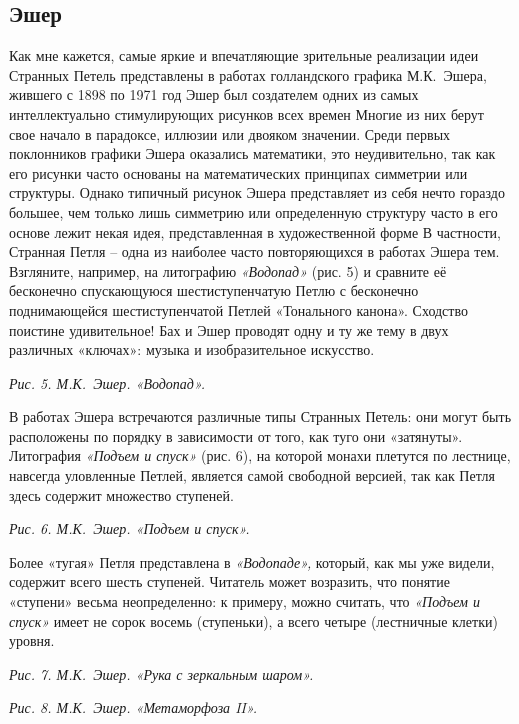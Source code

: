\documentclass[../main.tex]{subfiles}
\begin{document}
\subsection{Эшер}

Как мне кажется, самые яркие и впечатляющие зрительные реализации идеи Странных Петель представлены в работах голландского графика М.К.~Эшера, жившего с 1898 по 1971 год Эшер был создателем одних из самых интеллектуально стимулирующих рисунков всех времен Многие из них берут свое начало в парадоксе, иллюзии или двояком значении. Среди первых поклонников графики Эшера оказались математики, это неудивительно, так как его рисунки часто основаны на математических принципах симметрии или структуры. Однако типичный рисунок Эшера представляет из себя нечто гораздо большее, чем только лишь симметрию или определенную структуру часто в его основе лежит некая идея, представленная в художественной форме В частности, Странная Петля \--- одна из наиболее часто повторяющихся в работах Эшера тем. Взгляните, например, на литографию \emph{«Водопад»} (рис. 5) и сравните её бесконечно спускающуюся шестиступенчатую Петлю с бесконечно поднимающейся шестиступенчатой Петлей «Тонального канона». Сходство поистине удивительное! Бах и Эшер проводят одну и ту же тему в двух различных «ключах»: музыка и изобразительное искусство.

\emph{Рис. 5. М.К.~Эшер. «Водопад».}

В работах Эшера встречаются различные типы Странных Петель: они могут быть расположены по порядку в зависимости от того, как туго они «затянуты». Литография \emph{«Подъем и спуск»} (рис. 6), на которой монахи плетутся по лестнице, навсегда уловленные Петлей, является самой свободной версией, так как Петля здесь содержит множество ступеней.

\emph{Рис. 6. М.К.~Эшер. «Подъем и спуск».}

Более «тугая» Петля представлена в \emph{«Водопаде»,} который, как мы уже видели, содержит всего шесть ступеней. Читатель может возразить, что понятие «ступени» весьма неопределенно: к примеру, можно считать, что \emph{«Подъем и спуск»} имеет не сорок восемь (ступеньки), а всего четыре (лестничные клетки) уровня.

\emph{Рис. 7. М.К.~Эшер. «Рука с зеркальным шаром».}

\emph{Рис. 8. М.К.~Эшер. «Метаморфоза II».}
\end{document}
